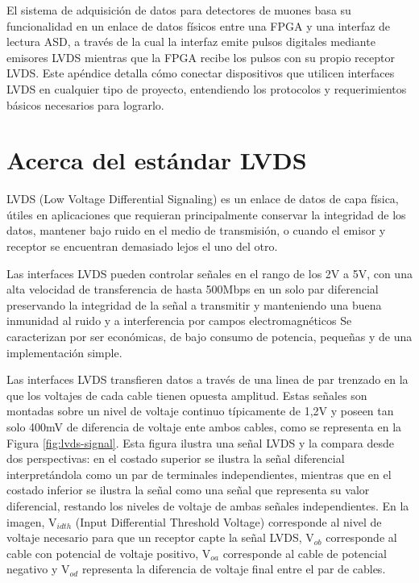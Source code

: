 El sistema de adquisición de datos para detectores de muones basa su funcionalidad en un enlace de datos físicos entre una FPGA y una interfaz de lectura ASD, a través de la cual la interfaz emite pulsos digitales mediante emisores LVDS mientras que la FPGA recibe los pulsos con su propio receptor LVDS. Este apéndice detalla cómo conectar dispositivos que utilicen interfaces LVDS en cualquier tipo de proyecto, entendiendo los protocolos y requerimientos básicos necesarios para lograrlo.

\section{Acerca del estándar LVDS}	
	LVDS (Low Voltage Differential Signaling) \cite{1996IEEESociety} es un enlace de datos de capa física, útiles en aplicaciones que requieran principalmente conservar la integridad de los datos, mantener bajo ruido en el medio de transmisión, o cuando el emisor y receptor se encuentran demasiado lejos el uno del otro.
	
	Las interfaces LVDS pueden controlar señales en el rango de los 2V a 5V, con una alta velocidad de transferencia de hasta 500Mbps en un solo par diferencial preservando la integridad de la señal a transmitir y manteniendo una buena inmunidad al ruido y a interferencia por campos electromagnéticos Se caracterizan por ser económicas, de bajo consumo de potencia, pequeñas y de una implementación simple.

	Las interfaces LVDS transfieren datos a través de una linea de par trenzado en la que los voltajes de cada cable tienen opuesta amplitud. Estas señales son montadas sobre un nivel de voltaje continuo típicamente de 1,2V y poseen tan solo 400mV de diferencia de voltaje ente ambos cables\cite{1996IEEESociety}, como se representa en la Figura \ref{fig:lvds-signal}. Esta figura ilustra una señal LVDS y la compara desde dos perspectivas: en el costado superior se ilustra la señal diferencial interpretándola como un par de terminales independientes, mientras que en el costado inferior se ilustra la señal como una señal que representa su valor diferencial, restando los niveles de voltaje de ambas señales independientes. En la imagen, V$_{idth}$ (Input Differential Threshold Voltage) corresponde al nivel de voltaje necesario para que un receptor capte la señal LVDS,  V$_{ob}$ corresponde al cable con potencial de voltaje positivo,  V$_{oa}$ corresponde al cable de potencial negativo y  V$_{od}$ representa la diferencia de voltaje final entre el par de cables.
	
